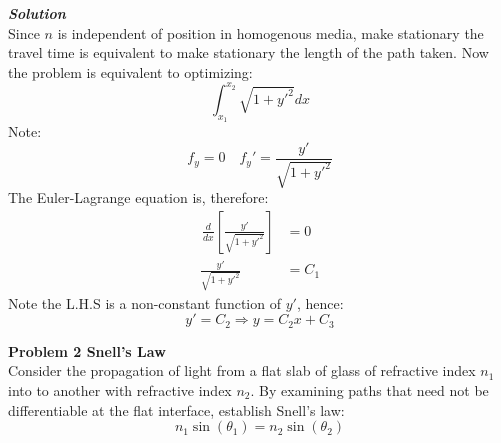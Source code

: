 \begin{framed}
\textbf{\textit{Solution}}\\
Since $n$ is independent of position in homogenous media, make stationary the travel time is equivalent to make stationary the length of the path taken. Now the problem is equivalent to optimizing:
\begin{equation}
\int_{x_1}^{x_2} \sqrt{1+y'^2}dx
\end{equation}
Note:
\begin{equation}
f_y = 0 \quad f_y' = \frac{y'}{\sqrt{1+y'^2}}
\end{equation}
The Euler-Lagrange equation is, therefore:
\begin{equation}
\begin{aligned}
\frac{}{}
    \frac{d}{dx}\left[ \frac{y'}{\sqrt{1+y'^2}}\right] &= 0 \\
    \frac{y'}{\sqrt{1+y'^2}} &= C_1
\end{aligned}
\end{equation}
Note the L.H.S is a non-constant function of $y'$, hence:
\begin{equation}
y'= C_2 \Longrightarrow y=C_2x+C_3
\end{equation}
\end{framed}

\begin{framed}
\textbf{\textbf{Problem 2} Snell's Law}\\
Consider the propagation of light from a flat slab of glass of refractive index $n_1$ into to
another with refractive index $n_2$. By examining paths that need not be differentiable
at the flat interface, establish Snell's law:
\begin{equation}
n_1\sin(\theta_1) = n_2\sin(\theta_2)
\end{equation}
\end{framed}

